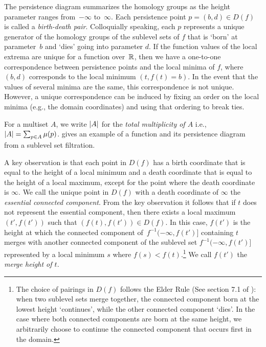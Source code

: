 The persistence diagram summarizes the homology
groups as the height parameter ranges from~$-\infty$ to~$\infty$.  Each
persistence point $p=(b,d)\in D(f)$ is called a \emph{birth-death pair}.
Colloquially speaking, each $p$ represents a unique generator of the
homology groups of the sublevel sets of $f$ that is `born' at parameter~$b$ and
`dies' going into parameter $d$. If the function values of the local
extrema are unique for a function over~$\mathbb{R}$,
then we have a one-to-one correspondence between
persistence points and the local minima of $f$,
where $(b,d)$ corresponds to the local minimum $(t,f(t)=b)$.
In the event that the values of several minima are the same, this correspondence is not unique. However, a unique
correspondence can be induced by fixing an order on the local minima (e.g.,
 the domain coordinates) and using
that ordering to break ties.

For a multiset $A$, we write $\left|A\right|$
for the \emph{total multiplicity of $A$} i.e., $\left|A\right| = \sum_{p \in
A} \mu(p)$.  gives an example of a function and its persistence
diagram from a sublevel set filtration.

A key observation is that each point in $D(f)$ has a birth
coordinate that is equal to the height of a local minimum and a death coordinate
that is equal to the height of a local maximum, except for the point where the
death coordinate is $\infty$. 
We call the unique point in $D(f)$ with a death coordinate of $\infty$
the \emph{essential connected component}. From the key observation it follows that  if
$t$ does not represent the essential component, then there exists a local
maximum $(t', f(t'))$
such that $(f(t),f(t')) \in D(f)$.
In this case, $f(t')$ is the height at which the connected
component of~$f^{-1}(-\infty, f(t')]$ containing $t$ merges with another
connected component of the sublevel set $f^{-1}(-\infty, f(t')]$ represented by
a local minimum $s$ where $f(s) < f(t)$.\footnote{The choice of pairings in
$D(f)$ follows the Elder Rule (See section 7.1 of
\cite{EdelsbrunnerComputational10}): when two sublevel sets
merge together, the connected component born at the lowest height `continues',
while the other connected component `dies'. In the case where both connected
components are born at the same height, we arbitrarily choose to continue the
connected component that occurs first in the domain.} We call $f(t')$ the
\emph{merge height of $t$}.

